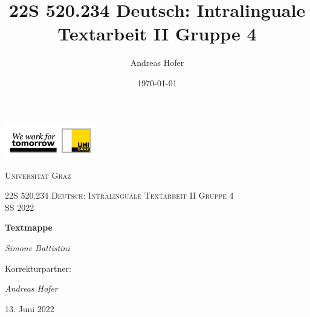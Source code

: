 \documentclass{article}
\title{\vspace{0cm}22S 520.234 Deutsch: Intralinguale Textarbeit II Gruppe 4}
\date{\today}
\author{Andreas Hofer}
\begin{document}
\begin{titlepage}
	\centering
	\includegraphics[width=0.30\textwidth]{KF_Logo.jpg}\par\vspace{1cm}
	{\scshape\LARGE Universität Graz \par}
	\vspace{1cm}
	{\scshape\Large 22S 520.234 Deutsch: Intralinguale Textarbeit II Gruppe 4 \\ SS 2022\par}
	\vspace{1.5cm}
	{\huge\bfseries Textmappe\par}
	\vspace{2cm}
	{\Large\itshape Simone Battistini\par}
	{\large Korrekturpartner: {\itshape Andreas Hofer\par}}
	\vfill

	{\large 13. Juni 2022\par}
\end{titlepage}
	
\end{document}
